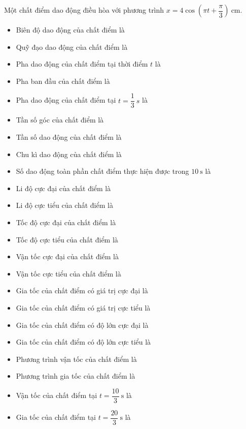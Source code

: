 \begin{vidu}
Một chất điểm dao động điều hòa với phương trình $x=4 \cos (\pi t+\dfrac{\pi}{3})\ \mathrm{cm}$.
\begin{itemize}
\item[1.] Biên độ dao động của chất điểm là\dotfill
\item[2.] Quỹ đạo dao động của chất điểm là\dotfill
\item[3.] Pha dao động của chất điểm tại thời điểm $t$ là\dotfill
\item[4.] Pha ban đầu của chất điểm là\dotfill
\item[5.] Pha dao động của chất điểm tại $t=\dfrac{1}{3}\ s$ là\dotfill
\item[6.] Tần số góc của chất điểm là\dotfill
\item[7.] Tần số dao động của chất điểm là\dotfill
\item[8.] Chu kì dao động của chất điểm là\dotfill
\item[9.] Số dao động toàn phần chất điểm thực hiện được trong $10 \mathrm{~s}$ là\dotfill
\item[10.] Li độ cực đại của chất điểm là\dotfill
\item[11.] Li độ cực tiểu của chất điểm là\dotfill
\item[12.] Tốc độ cực đại của chất điểm là\dotfill
\item[13.] Tốc độ cực tiểu của chất điểm là\dotfill
\item[14.] Vận tốc cực đại của chất điểm là\dotfill
\item[15.] Vận tốc cực tiểu$ $ của chất điểm là\dotfill
\item[16.] Gia tốc của chất điểm có giá trị cực đại là\dotfill
\item[17.] Gia tốc của chất điểm có giá trị cực tiểu là\dotfill
\item[18.] Gia tốc của chất điểm có độ lớn cực đại là\dotfill
\item[19.] Gia tốc của chất điểm có độ lớn cực tiểu là\dotfill
\item[20.] Phương trình vận tốc của chất điểm là\dotfill
\item[21.] Phương trình gia tốc của chất điểm là\dotfill
\item[22.] Vận tốc của chất điểm tại $t=\dfrac{10}{3} \mathrm{~s}$ là\dotfill
\item[23.] Gia tốc của chất điểm tại $t=\dfrac{20}{3} \mathrm{~s}$ là\dotfill
\end{itemize}
\loigiai{
\begin{center} 

\end{center}}
\end{vidu}
